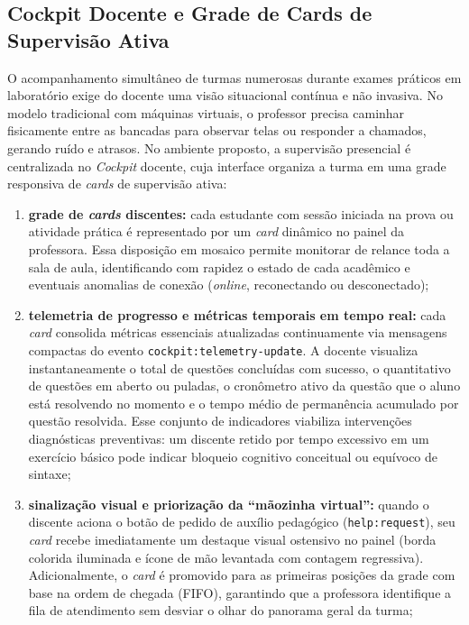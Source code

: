 \subsection{Cockpit Docente e Grade de Cards de Supervisão Ativa}
\label{sec:cockpit-cards}

O acompanhamento simultâneo de turmas numerosas durante exames práticos em laboratório exige do docente uma visão situacional contínua e não invasiva. No modelo tradicional com máquinas virtuais, o professor precisa caminhar fisicamente entre as bancadas para observar telas ou responder a chamados, gerando ruído e atrasos. No ambiente proposto, a supervisão presencial é centralizada no \textit{Cockpit} docente, cuja interface organiza a turma em uma grade responsiva de \textit{cards} de supervisão ativa:

\begin{enumerate}
    \item \textbf{grade de \textit{cards} discentes:} cada estudante com sessão iniciada na prova ou atividade prática é representado por um \textit{card} dinâmico no painel da professora. Essa disposição em mosaico permite monitorar de relance toda a sala de aula, identificando com rapidez o estado de cada acadêmico e eventuais anomalias de conexão (\textit{online}, reconectando ou desconectado);

    \item \textbf{telemetria de progresso e métricas temporais em tempo real:} cada \textit{card} consolida métricas essenciais atualizadas continuamente via mensagens compactas do evento \texttt{cockpit:}\allowbreak\texttt{telemetry-update}. A docente visualiza instantaneamente o total de questões concluídas com sucesso, o quantitativo de questões em aberto ou puladas, o cronômetro ativo da questão que o aluno está resolvendo no momento e o tempo médio de permanência acumulado por questão resolvida. Esse conjunto de indicadores viabiliza intervenções diagnósticas preventivas: um discente retido por tempo excessivo em um exercício básico pode indicar bloqueio cognitivo conceitual ou equívoco de sintaxe;

    \item \textbf{sinalização visual e priorização da ``mãozinha virtual'':} quando o discente aciona o botão de pedido de auxílio pedagógico (\texttt{help:request}), seu \textit{card} recebe imediatamente um destaque visual ostensivo no painel (borda colorida iluminada e ícone de mão levantada com contagem regressiva). Adicionalmente, o \textit{card} é promovido para as primeiras posições da grade com base na ordem de chegada (FIFO), garantindo que a professora identifique a fila de atendimento sem desviar o olhar do panorama geral da turma;


\end{enumerate}
